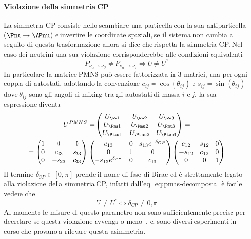 \documentclass[../../main.tex]{subfiles}
\begin{document}
  \paragraph{Violazione della simmetria CP}
    La simmetria CP consiste nello scambiare una particella con la sua
    antiparticella ($\Pnu \rightarrow \APnu$) e invertire le coordinate
    spaziali, se il sistema non cambia a seguito
    di questa trasformazione allora si dice che rispetta la simmetria CP\@.
    Nel caso dei neutrini una sua violazione corrisponderebbe alle condizioni
    equivalenti
    \begin{equation*}
      P_{\nu_\alpha \rightarrow \nu_\beta} \neq
      P_{\bar{\nu}_\alpha \rightarrow \bar{\nu}_\beta} \iff
      U \neq U^*
    \end{equation*}
    In particolare la matrice PMNS può essere fattorizzata in 3 matrici, una
    per ogni coppia di
    autostati, adottando la convenzione $c_{ij} = \cos(\theta_{ij})$ e
    $s_{ij} = \sin(\theta_{ij})$ dove $\theta_{ij}$ sono gli angoli di
    mixing tra gli autostati di massa $i$ e $j$, la sua espressione diventa
    \begin{multline}
      U^{PMNS} =
      \begin{pmatrix}
        U_{\Pe 1} & U_{\Pe 2} & U_{\Pe 3} \\
        U_{\Pmu 1} & U_{\Pmu 2} & U_{\Pmu 3} \\
        U_{\Ptau 1} & U_{\Ptau 2} & U_{\Ptau 3}
      \end{pmatrix} = \\ =
      \begin{pmatrix}
        1 & 0 & 0 \\
        0 & c_{23} & s_{23} \\
        0 & -s_{23} & c_{23}
      \end{pmatrix}
      \begin{pmatrix}
        c_{13} & 0 & s_{13} e^{-\delta_{CP}} \\
        0 & 1 & 0 \\
        -s_{13} e^{\delta_{CP}} & 0 & c_{13}
      \end{pmatrix}
      \begin{pmatrix}
        c_{12} & s_{12} & 0 \\
        -s_{12} & c_{12} & 0 \\
        0 & 0 & 1
      \end{pmatrix}
      \label{eq:pmns-decomposta}
    \end{multline}
    Il termine $\delta_{CP} \in \left[ 0, \pi \right] $ prende il nome di
    fase di Dirac ed è strettamente legato alla violazione della simmetria CP,
    infatti dall'eq~\eqref{eq:pmns-decomposta} è facile vedere che
    \begin{equation*}
      U \neq U^* \iff \delta_{CP} \neq 0, \pi
    \end{equation*}
    Al momento le misure di questo parametro non sono sufficientemente
    precise per decretare se questa violazione avvenga o
    meno~\cite{Esteban_2020}, ci sono diversi esperimenti in corso che
    provano a rilevare questa asimmetria.
\end{document}
